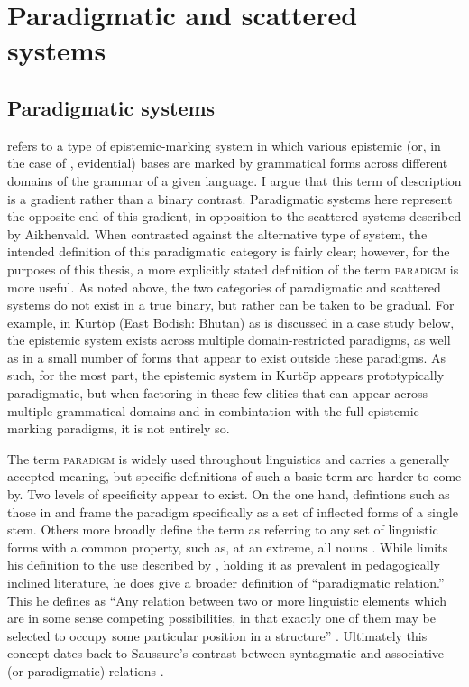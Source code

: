 \section{Paradigmatic and scattered systems}
\subsection{Paradigmatic systems}\label{sss:Discussion:Paradigmatic}
 refers to a type of epistemic-marking system in which various epistemic (or, in the case of , evidential) bases are marked by grammatical forms across different domains of the grammar of a given language. I argue that this term of description is a gradient rather than a binary contrast. Paradigmatic systems here represent the opposite end of this gradient, in opposition to the scattered systems described by Aikhenvald. When contrasted against the alternative type of system, the intended definition of this paradigmatic category is fairly clear; however, for the purposes of this thesis, a more explicitly stated definition of the term \textsc{paradigm} is more useful. As noted above, the two categories of paradigmatic and scattered systems do not exist in a true binary, but rather can be taken to be gradual. For example, in Kurtöp (East Bodish: Bhutan) as is discussed in a case study below, the epistemic system exists across multiple domain-restricted paradigms, as well as in a small number of forms that appear to exist outside these paradigms. As such, for the most part, the epistemic system in Kurtöp appears prototypically paradigmatic, but when factoring in these few clitics that can appear across multiple grammatical domains and in combintation with the full epistemic-marking paradigms, it is not entirely so.

The term \textsc{paradigm} is widely used throughout linguistics and carries a generally accepted meaning, but specific definitions of such a basic term are harder to come by. Two levels of specificity appear to exist. On the one hand, defintions such as those in  and  frame the paradigm specifically as a set of inflected forms of a single stem. Others more broadly define the term as referring to any set of linguistic forms with a common property, such as, at an extreme, all nouns \cite{Booij2007}. While  limits his definition to the use described by , holding it as prevalent in pedagogically inclined literature, he does give a broader definition of ``paradigmatic relation.'' This he defines as ``Any relation between two or more linguistic elements which are in some sense competing possibilities, in that exactly one of them may be selected to occupy some particular position in a structure'' \cite[197]{Trask1993}. Ultimately this concept dates back to Saussure's contrast between syntagmatic and associative (or paradigmatic) relations \cite{Saussure2013}.

